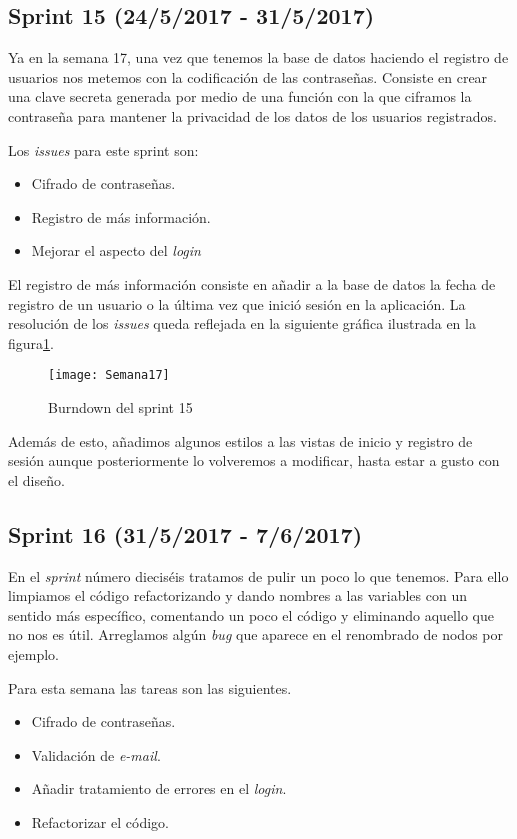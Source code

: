 \subsection{Sprint 15 (24/5/2017 - 31/5/2017)}

Ya en la semana 17, una vez que tenemos la base de datos haciendo el registro de usuarios nos metemos con la codificación de las contraseñas. Consiste en crear una clave secreta generada por medio de una función con la que ciframos la contraseña para mantener la privacidad de los datos de los usuarios registrados. 

Los \emph{issues} para este sprint son:
\begin{itemize}
\item Cifrado de contraseñas.
\item Registro de más información.
\item Mejorar el aspecto del \emph{login}
\end{itemize}

El registro de más información consiste en añadir a la base de datos la fecha de registro de un usuario o la última vez que inició sesión en la aplicación. La resolución de los \emph{issues} queda reflejada en la siguiente gráfica ilustrada en la figura\ref{fig:A.14}.

\begin{figure}[h]
\centering
\texttt{[image: Semana17]}
\caption{Burndown del sprint 15}
\label{fig:A.14}
\end{figure}

Además de esto, añadimos algunos estilos a las vistas de inicio y registro de sesión aunque posteriormente lo volveremos a modificar, hasta estar a gusto con el diseño.

\subsection{Sprint 16 (31/5/2017 - 7/6/2017)}

En el \emph{sprint} número dieciséis tratamos de pulir un poco lo que tenemos. Para ello limpiamos el código refactorizando y dando nombres a las variables con un sentido más específico, comentando un poco el código y eliminando aquello que no nos es útil. Arreglamos algún \emph{bug} que aparece en el renombrado de nodos por ejemplo.


Para esta semana las tareas son las siguientes.
\begin{itemize}
\item Cifrado de contraseñas.
\item Validación de \emph{e-mail}.
\item Añadir tratamiento de errores en el \emph{login}.
\item Refactorizar el código.
\end{itemize}

